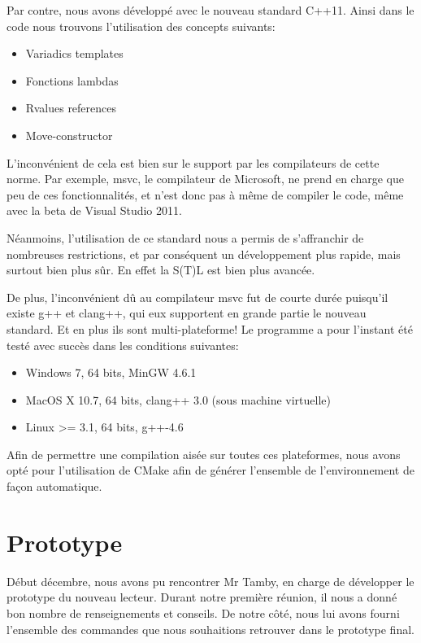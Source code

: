 Par contre, nous avons développé avec le nouveau standard C++11. Ainsi
dans le code nous trouvons l'utilisation des concepts suivants:

    \begin{itemize}
    \item Variadics templates
    \item Fonctions lambdas
    \item Rvalues references
    \item Move-constructor
    \end{itemize}

L'inconvénient de cela est bien sur le support par les compilateurs de cette
norme. Par exemple, msvc, le compilateur de Microsoft, ne prend en charge que peu
de ces fonctionnalités, et n'est donc pas à même de compiler le code, même avec la
beta de Visual Studio 2011.

Néanmoins, l'utilisation de ce standard nous a permis de s'affranchir de nombreuses
restrictions, et par conséquent un développement plus rapide, mais surtout bien
plus sûr. En effet la S(T)L est bien plus avancée.

De plus, l'inconvénient dû au compilateur msvc fut de courte durée puisqu'il
existe g++ et clang++, qui eux supportent en grande partie le nouveau standard.
Et en plus ils sont multi-plateforme! Le programme a pour l'instant été testé 
avec succès dans les conditions suivantes:

    \begin{itemize}
    \item Windows 7, 64 bits, MinGW 4.6.1
    \item MacOS X 10.7, 64 bits, clang++ 3.0 (sous machine virtuelle)
    \item Linux >= 3.1, 64 bits, g++-4.6
    \end{itemize}

Afin de permettre une compilation aisée sur toutes ces plateformes, nous avons
opté pour l'utilisation de CMake afin de générer l'ensemble de l'environnement de
façon automatique.


    \section{Prototype}
Début décembre, nous avons pu rencontrer Mr Tamby, en charge de développer le
prototype du nouveau lecteur. Durant notre première réunion, il nous a donné
bon nombre de renseignements et conseils. De notre côté, nous lui avons fourni
l'ensemble des commandes que nous souhaitions retrouver dans le prototype final.

